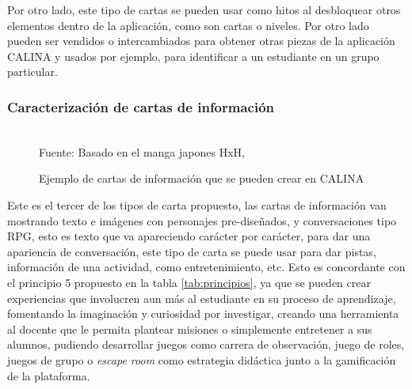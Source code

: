 Por otro lado, este tipo de cartas se pueden usar como hitos al desbloquear otros elementos dentro de la 
aplicación, como son cartas o niveles. Por otro lado pueden ser vendidos o intercambiados para obtener otras 
piezas de la aplicación CALINA y usados por ejemplo, para identificar a un estudiante en un grupo particular.

\subsubsection{Caracterización de cartas de información}

\begin{figure}[H]
\caption{Ejemplo de cartas de información que se pueden crear en CALINA}
\label{img:modelodecartasinfo}
\centering
\begin{adjustbox}{width=12cm}
\end{adjustbox}
\\
{\footnotesize Fuente: Basado en el manga japones HxH, }
\end{figure}

Este es el tercer de los tipos de carta propuesto, las cartas de información van mostrando texto e 
imágenes con personajes pre-diseñados, y conversaciones tipo RPG, esto es texto que va apareciendo carácter 
por carácter, para dar una apariencia de conversación, este tipo de carta se puede usar para dar pistas, 
información de una actividad, como entretenimiento, etc. Esto es concordante con el principio 5 propuesto en 
la tabla \ref{tab:principios}, ya que se pueden crear experiencias que involucren aun más al estudiante en su 
proceso de aprendizaje, fomentando la imaginación y curiosidad por investigar, creando una herramienta al 
docente que le permita plantear misiones o simplemente entretener a sus alumnos, pudiendo desarrollar juegos 
como carrera de observación, juego de roles, juegos de grupo o \textit{escape room} como estrategia didáctica 
junto a la gamificación de la plataforma.

